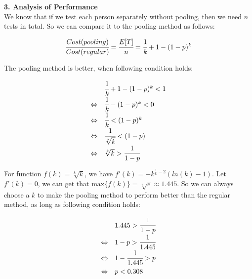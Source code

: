 
\noindent
\textbf{3. Analysis of Performance}\\

We know that if we test each person separately without pooling, then we need $n$ tests in total. So we can compare it to the pooling method as follows:

\[
  \cfrac{Cost(pooling)}{Cost(regular)} = \cfrac{E[T]}{n} = \cfrac{1}{k} + 1 - (1 - p)^k
\]

The pooling method is better, when following condition holds:

\[
\def\arraystretch{1.5}
\begin{array}{l l}
                & \cfrac{1}{k} + 1 - (1 - p)^k < 1 \\
\Leftrightarrow & \cfrac{1}{k} - (1 - p)^k < 0 \\
\Leftrightarrow & \cfrac{1}{k} < (1 - p)^k \\
\Leftrightarrow & \cfrac{1}{\sqrt[k]{k}} < (1 - p) \\
\Leftrightarrow & \sqrt[k]{k} > \cfrac{1}{1 - p} \\
\end{array}
\]

For function $f(k) = \sqrt[k]{k}$, we have $f'(k) = -k^{\frac{1}{k}-2}(ln(k) - 1)$. Let $f'(k) = 0$, we can get that $\text{max}\{f(k)\} = \sqrt[e]{e} \approx 1.445$. So we can always choose a $k$ to make the pooling method to perform better than the regular method, as long as following condition holds:

\[
\def\arraystretch{1.5}
\begin{array}{l l}
                & 1.445 > \cfrac{1}{1 - p} \\
\Leftrightarrow & 1 - p > \cfrac{1}{1.445} \\
\Leftrightarrow & 1 - \cfrac{1}{1.445} > p \\
\Leftrightarrow & p < 0.308 \\
\end{array}
\]
